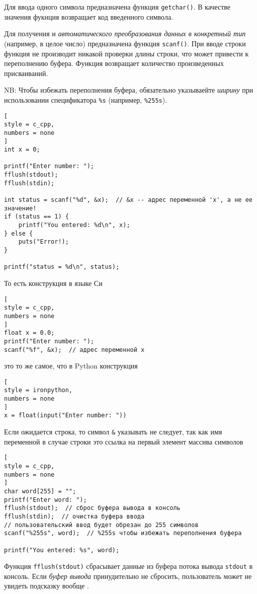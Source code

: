 \documentclass[%
	11pt,
	a4paper,
	utf8,
		]{article}
\begin{document}
Для ввода одного символа предназначена функция \verb*|getchar()|. В качестве значения фукнция возвращает код введенного символа.

Для получения и \emph{автоматического преобразования данных в конкретный тип} (например, в целое число) предназначена функция \verb*|scanf()|. При вводе строки функция не производит никакой проверки длины строки, что может привести к переполнению буфера. Функция возвращает количество произведенных присваиваний.

NB: Чтобы избежать переполнения буфера, обязательно указываейте \emph{ширину} при использовании спецификатора \verb*|%s| (например, \verb|%255s|).

\begin{lstlisting}[
style = c_cpp,
numbers = none
]
int x = 0;

printf("Enter number: ");
fflush(stdout);
fflush(stdin);

int status = scanf("%d", &x);  // &x -- адрес переменной 'x', а не ее значение!
if (status == 1) {
    printf("You entered: %d\n", x);
} else {
    puts("Error!);
}

printf("status = %d\n", status);
\end{lstlisting}

То есть конструкция в языке Си
\begin{lstlisting}[
style = c_cpp,
numbers = none
]
float x = 0.0;
printf("Enter number: ");
scanf("%f", &x);  // адрес переменной x
\end{lstlisting}
это то же самое, что в Python конструкция
\begin{lstlisting}[
style = ironpython,
numbers = none
]
x = float(input("Enter number: "))
\end{lstlisting}

Если ожидается строка, то символ \verb*|&| указывать не следует, так как имя переменной в случае строки это ссылка на первый элемент массива символов
\begin{lstlisting}[
style = c_cpp,
numbers = none
]
char word[255] = "";
printf("Enter word: ");
fflush(stdout);  // сброс буфера вывода в консоль
fflush(stdin);  // очистка буфера ввода
// пользовательский ввод будет обрезан до 255 символов
scanf("%255s", word);  // %255s чтобы избежать переполнения буфера

printf("You entered: %s", word);
\end{lstlisting}

Функция \verb|fflush(stdout)| сбрасывает данные из буфера потока вывода \verb*|stdout| в консоль. Если \emph{буфер вывода} принудительно не сбросить, пользователь может не увидеть подсказку вообще \cite[]{prokhorenok-prog-c:2020}.
\end{document}
